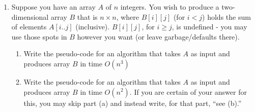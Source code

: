 \documentclass{article}
\begin{document}
\begin{enumerate}[label=\Large\textbf{\arabic*}.]
\item Suppose you have an array $A$ of $n$ integers.  You wish to produce a two-dimensional array $B$ that is $n \times n$, where $B[i][j]$ (for $i < j$) holds the sum of elements $A[i..j]$ (inclusive).  $B[i][j]$, for $i \geq j$, is undefined - you may use those spots in $B$ however you want (or leave garbage/defaults there).
\begin{enumerate}
	\item Write the pseudo-code for an algorithm that takes $A$ as input and produces array $B$ in time $O(n^3)$
	\item Write the pseudo-code for an algorithm that takes $A$ as input and produces array $B$ in time $O(n^2)$.  If you are certain of your answer for this, you may skip part (a) and instead write, for that part, ``see (b).''
	
\end{enumerate}

\end{enumerate}
\end{document}
